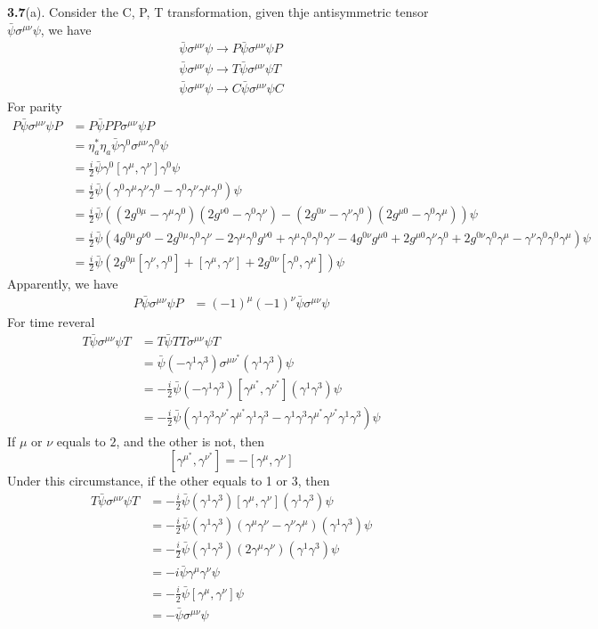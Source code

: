 \documentclass{article}
\newcommand{\gm}{\gamma^{\mu}}
\newcommand{\gn}{\gamma^{\nu}}
\newcommand{\s}{\sigma}
\begin{document}
{\bf3.7}\quad(a). Consider the C, P, T transformation, given thje antisymmetric tensor $\bar\psi\sigma^{\mu\nu}\psi$, we have
\begin{align*}
  \bar\psi\sigma^{\mu\nu}\psi\rightarrow P\bar\psi\sigma^{\mu\nu}\psi P\\
  \bar\psi\sigma^{\mu\nu}\psi\rightarrow T\bar\psi\sigma^{\mu\nu}\psi T\\
  \bar\psi\sigma^{\mu\nu}\psi\rightarrow C\bar\psi\sigma^{\mu\nu}\psi C
\end{align*}
For parity
\begin{align*}
  P\bar\psi\sigma^{\mu\nu}\psi P&=P\bar\psi PP\sigma^{\mu\nu}\psi P\\
  &=\eta_a^*\eta_a\bar\psi\gamma^0\sigma^{\mu\nu}\gamma^0\psi \\
  &=\frac{i}{2}\bar\psi\gamma^0[\gm,\gn]\gamma^0\psi\\
  &=\frac{i}{2}\bar\psi(\gamma^0\gm\gn\gamma^0-\gamma^0\gn\gm\gamma^0)\psi\\
  &=\frac{i}{2}\bar\psi((2g^{0\mu}-\gm\gamma^0)(2g^{\nu0}-\gamma^0\gn)-(2g^{0\nu}-\gn\gamma^0)(2g^{\mu0}-\gamma^0\gm))\psi\\
  &=\frac{i}{2}\bar\psi(4g^{0\mu}g^{\nu0}-2g^{0\mu}\gamma^0\gn-2\gm\gamma^0g^{\nu0}+\gm\gamma^0\gamma^0\gn-4g^{0\nu}g^{\mu0}+2g^{\mu0}\gn\gamma^0+2g^{0\nu}\gamma^0\gm-\gn\gamma^0\gamma^0\gm)\psi\\
  &=\frac{i}{2}\bar\psi(2g^{0\mu}[\gn,\gamma^0]+[\gm,\gn]+2g^{0\nu}[\gamma^0,\gm])\psi
\end{align*}
Apparently, we have
\begin{align*}
  P\bar\psi\sigma^{\mu\nu}\psi P&=(-1)^{\mu}(-1)^{\nu}\bar\psi\sigma^{\mu\nu}\psi
\end{align*}
For time reveral
\begin{align*}
  T\bar\psi\sigma^{\mu\nu}\psi T&=T\bar\psi TT\sigma^{\mu\nu}\psi T\\
  &=\bar\psi (-\gamma^1\gamma^3) \sigma^{\mu\nu}^*(\gamma^1\gamma^3)\psi\\
  &=-\frac{i}{2}\bar\psi (-\gamma^1\gamma^3) [\gm^*,\gn^*](\gamma^1\gamma^3)\psi\\
  &=-\frac{i}{2}\bar\psi (\gamma^1\gamma^3\gn^*\gm^*\gamma^1\gamma^3-\gamma^1\gamma^3\gm^*\gn^*\gamma^1\gamma^3)\psi
\end{align*}
If $\mu$ or $\nu$ equals to $2$, and the other is not, then
$$[\gm^*,\gn^*]=-[\gm,\gn]$$
Under this circumstance, if the other equals to 1 or 3, then
\begin{align*}
  T\bar\psi\sigma^{\mu\nu}\psi T&=-\frac{i}{2}\bar\psi (\gamma^1\gamma^3) [\gm,\gn](\gamma^1\gamma^3)\psi\\
  &=-\frac{i}{2}\bar\psi (\gamma^1\gamma^3) (\gm\gn-\gn\gm)(\gamma^1\gamma^3)\psi\\
  &=-\frac{i}{2}\bar\psi (\gamma^1\gamma^3) (2\gm\gn)(\gamma^1\gamma^3)\psi\\
  &=-i\bar\psi\gm\gn\psi\\
  &=-\frac{i}{2}\bar\psi [\gm,\gn]\psi\\
  &=-\bar\psi\s^{\mu\nu}\psi
\end{align*}
\end{document}
